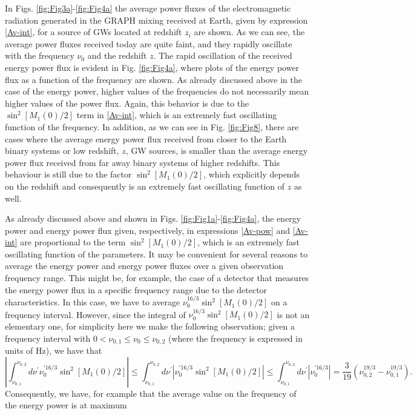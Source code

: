 \documentclass[a4paper,11pt]{article}
\begin{document}
In Figs. \ref{fig:Fig3a}-\ref{fig:Fig4a} the average power fluxes of the electromagnetic radiation generated in the GRAPH mixing received at Earth, given by expression \eqref{Av-int}, for a source of GWs located at redshift $z_i$ are shown. As we can see, the average power fluxes received today are quite faint, and they rapidly oscillate with the frequency $\nu_0$ and the redshift $z$. The rapid oscillation of the received energy power flux is evident in Fig. \ref{fig:Fig4a}, where plots of the energy power flux as a function of the frequency are shown. As already discussed above in the case of the energy power, higher values of the frequencies do not necessarily mean higher values of the power flux. Again, this behavior is due to the $\sin^2[M_1(0)/2]$ term in \eqref{Av-int}, which is an extremely fast oscillating function of the frequency. In addition, as we can see in Fig. \ref{fig:Fig8}, there are cases where the average energy power flux received from closer to the Earth binary systems or low redshift, $z$, GW sources, is smaller than the average energy power flux received from far away binary systems of higher redshifts. This behaviour is still due to the factor  $\sin^2[M_1(0)/2]$, which explicitly depends on the redshift and consequently is an extremely fast oscillating function of $z$ as well.



As already discussed above and shown in Figs. \ref{fig:Fig1a}-\ref{fig:Fig4a}, the energy power and energy power flux given, respectively, in expressions \eqref{Av-pow} and \eqref{Av-int} are proportional to the term $\sin^2[M_1(0)/2]$, which is an extremely fast oscillating function of the parameters. It may be convenient for several reasons to average the energy power and energy power fluxes over a given observation frequency range. This might be, for example, the case of a detector that measures the energy power flux in a specific frequency range due to the detector characteristics.  In this case, we have to average $\nu_0^{16/3}\sin^2[M_1(0)/2]$ on a frequency interval. However, since the integral of $\nu_0^{16/3}\sin^2[M_1(0)/2]$ is not an elementary one, for simplicity here we make the following observation; given a frequency interval with $0<\nu_{0, 1}\leq \nu_0\leq {\nu_{0, 2}}$ (where the frequency is expressed in units of Hz), we have that
\begin{equation}\nonumber
\left| \int_{\nu_{0, 1}}^{\nu_{0, 2}} d\nu^\prime \nu_{0}^{\prime 16/3}\sin^2[M_1(0)/2] \right|\leq \int_{\nu_{0, 1}}^{\nu_{0, 2}} d\nu^\prime \left| \nu_{0}^{\prime 16/3}\sin^2[M_1(0)/2] \right| \leq \int_{\nu_{0, 1}}^{\nu_{0, 2}} d\nu^\prime \left| \nu_{0}^{\prime 16/3} \right|=\frac{3}{19}\left( \nu_{0, 2}^{19/3} - \nu_{0, 1}^{19/3}\right).
\end{equation}
Consequently, we have, for example that the average value on the frequency of the energy power is at maximum
\end{document}
